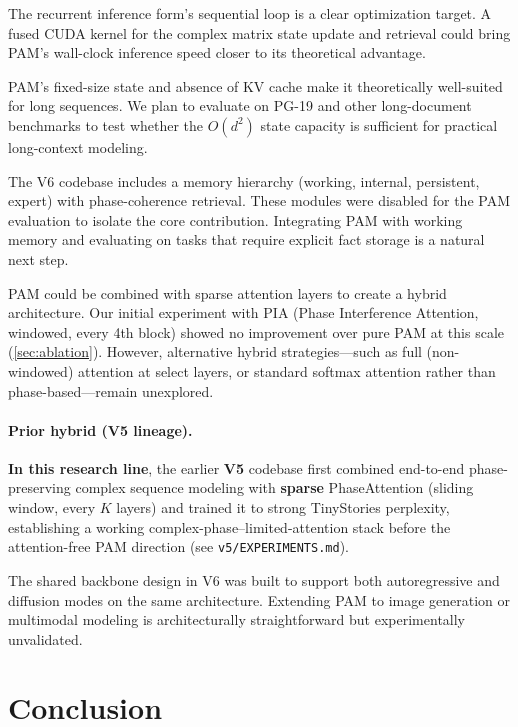 \documentclass[11pt]{article}
\begin{document}
The recurrent inference form's sequential loop is a clear optimization target. A fused CUDA kernel for the complex matrix state update and retrieval could bring PAM's wall-clock inference speed closer to its theoretical advantage.

PAM's fixed-size state and absence of KV cache make it theoretically well-suited for long sequences. We plan to evaluate on PG-19 and other long-document benchmarks to test whether the $O(d^2)$ state capacity is sufficient for practical long-context modeling.

The V6 codebase includes a memory hierarchy (working, internal, persistent, expert) with phase-coherence retrieval. These modules were disabled for the PAM evaluation to isolate the core contribution. Integrating PAM with working memory and evaluating on tasks that require explicit fact storage is a natural next step.

PAM could be combined with sparse attention layers to create a hybrid architecture. Our initial experiment with PIA (Phase Interference Attention, windowed, every 4th block) showed no improvement over pure PAM at this scale (\cref{sec:ablation}). However, alternative hybrid strategies---such as full (non-windowed) attention at select layers, or standard softmax attention rather than phase-based---remain unexplored.

\paragraph{Prior hybrid (V5 lineage).} \textbf{In this research line}, the earlier \textbf{V5} codebase first combined end-to-end phase-preserving complex sequence modeling with \textbf{sparse} PhaseAttention (sliding window, every $K$ layers) and trained it to strong TinyStories perplexity, establishing a working complex-phase--limited-attention stack before the attention-free PAM direction (see \texttt{v5/EXPERIMENTS.md}).

The shared backbone design in V6 was built to support both autoregressive and diffusion modes on the same architecture. Extending PAM to image generation or multimodal modeling is architecturally straightforward but experimentally unvalidated.

\section{Conclusion}
\end{document}
